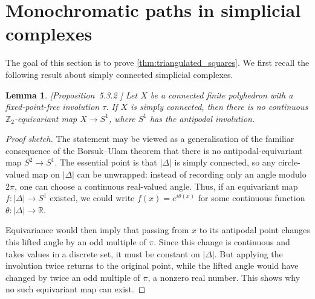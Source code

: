 \documentclass[12pt,UKenglish]{amsart}
\theoremstyle{plain}
\newtheorem{lemma}[lemma]{Lemma}
\theoremstyle{definition}
\theoremstyle{remark}
\begin{document}
\section{Monochromatic paths in simplicial complexes}\label{sec:topological-criterion}
The goal of this section is to prove \cref{thm:triangulated_squares}. We first recall the following result about simply connected simplicial complexes.
\begin{lemma}\label{lem:no-equivariant-map}[Proposition~5.3.2 \cite{Borsuk-Ulam}]
Let \(X\) be a connected finite polyhedron with a fixed-point-free involution
\(\tau\). If \(X\) is simply connected, then there is no continuous
\(\mathbb Z_2\)-equivariant map \(X\to S^1\), where \(S^1\) has the antipodal
involution.
\end{lemma}
\begin{proof}[Proof sketch]
The statement may be viewed as a generalisation of the familiar consequence of the Borsuk–Ulam theorem that there is no antipodal-equivariant map \(S^2\to S^1\). The essential point is that \(|\Delta|\) is simply connected, so any circle-valued map on \(|\Delta|\) can be unwrapped: instead of recording only an angle modulo \(2\pi\), one can choose a continuous real-valued angle. Thus, if an equivariant map \(f:|\Delta|\to S^1\) existed, we could write
\(
f(x)=e^{i\theta(x)}
\)
for some continuous function \(\theta:|\Delta|\to\mathbb R\). 

Equivariance would then imply that passing from \(x\) to its antipodal point changes this lifted angle by an odd multiple of \(\pi\). Since this change is continuous and takes values in a discrete set, it must be constant on \(|\Delta|\). But applying the involution twice returns to the original point, while the lifted angle would have changed by twice an odd multiple of \(\pi\), a nonzero real number. This shows why no such equivariant map can exist.
\end{proof}
\end{document}
